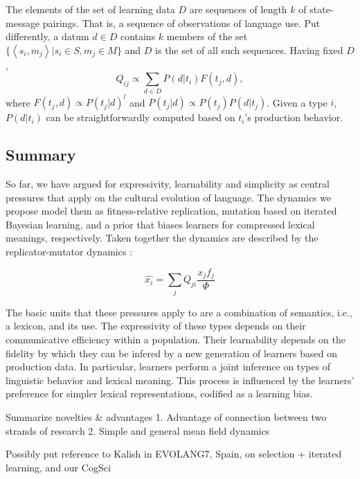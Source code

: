 \documentclass[a4paper]{article}
\newcommand{\tuple}[1]{\ensuremath{\left\langle #1 \right\rangle}}
\newcommand{\hl}[1]{\textcolor[rgb]{.8,.33,.0}{#1}}%
\begin{document}
The elements of the set of learning data $D$ are sequences of length $k$ of state-message pairings. That is, a sequence of observations of language use. Put differently, a datum $d \in D$ contains $k$ members of the set $\{\tuple{s_i,m_j} | s_i \in S, m_j \in M\}$ and $D$ is the set of all such sequences. Having fixed $D$,
\[
 Q_{ij} \propto \sum_{d \in D} P(d|t_i) F(t_j,d),
\]
where $F(t_j,d) \propto P(t_j|d)^l$ and $P(t_j|d) \propto P(t_j) P(d|t_j)$. Given a type $i$, $P(d|t_i)$ can be straightforwardly computed based on $t_i$'s production behavior. 
 

\subsection{Summary}
So far, we have argued for expressivity, learnability and simplicity as central pressures that apply on the cultural evolution of language. The dynamics we propose model them as fitness-relative replication, mutation based on iterated Bayesian learning, and a prior that biases learners for compressed lexical meanings, respectively. Taken together the dynamics are described by the replicator-mutator dynamics \citep{hofbauer+sigmund:2003}: 

\[ 
\hat{x_i} = \sum_j Q_{ji} \frac{x_jf_j}{\Phi}
\]

The basic units that these pressures apply to are a combination of semantics, i.e., a lexicon, and its use. The expressivity of these types depends on their communicative efficiency within a population. Their learnability depends on the fidelity by which they can be infered by a new generation of learners based on production data. In particular, learners perform a joint inference on types of linguistic behavior and lexical meaning. This process is influenced by the learners' preference for simpler lexical representations, codified as a learning bias.

\hl{Summarize novelties \& advantages
1. Advantage of connection between two strands of research
2. Simple and general mean field dynamics}

\hl{Possibly put reference to Kalish in EVOLANG7, Spain, on selection + iterated learning, and our CogSci}


\end{document}
